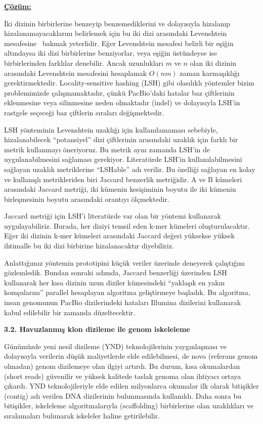\documentclass[11pt]{article}
\begin{document}
{\bf {\underline{Çözüm:}}}

İki dizinin birbirlerine benzeyip benzemediklerini ve dolayısıyla hizalanıp hizalanamayacaklarını belirlemek için bu iki dizi arasındaki Levenshtein mesafesine~\cite{Levenshtein1966} bakmak yeterlidir. Eğer Levenshtein mesafesi belirli bir eşiğin altındaysa iki dizi birbirlerine benziyorlar, veya eşiğin üstündeyse ise birbirlerinden farklılar denebilir. Ancak uzunlukları $m$ ve $n$ olan iki dizinin arasındaki Levenshtein mesafesini hesaplamak $O(nm)$ zaman karmaşıklığı gerektirmektedir. Locality-sensitive hashing (LSH) gibi olasılıklı yöntemler bizim problemimizde çalışmamaktadır,  çünkü PacBio'daki hatalar baz çiftlerinin eklenmesine veya silinmesine neden olmaktadır (indel) ve dolayısıyla LSH'in rastgele seçeceği baz çiftlerin sıraları değişmektedir.


LSH yönteminin Levenshtein uzaklığı için kullanılamaması sebebiyle, hizalanabilecek ``potansiyel'' dizi çiftlerinin arasındaki uzaklık için farklı bir metrik kullanmayı öneriyoruz. Bu metrik aynı zamanda LSH'in de uygulanabilmesini sağlaması gerekiyor. Literatürde LSH'in kullanılabilmesini sağlayan uzaklık metriklerine ``LSHable'' adı verilir. Bu özelliği sağlayan en kolay ve kullanışlı metrikleriden biri Jaccard benzerlik metriğidir. A ve B kümeleri arasındaki Jaccard metriği, iki kümenin kesişiminin boyutu ile iki kümenin birleşmesinin boyutu arasındaki orantıyı ölçmektedir.


Jaccard metriği için LSH'i literatürde var olan bir yöntemi \cite{Broder1998} kullanarak uygulayabiliriz. Burada, her diziyi temsil eden k-mer kümeleri oluşturulacaktır. Eğer iki dizinin k-mer kümeleri arasındaki Jaccard değeri yüksekse yüksek ihtimalle bu iki dizi birbirine hizalanacaktır diyebiliriz.

Anlattığımız yöntemin prototipini küçük veriler üzerinde deneyerek çalıştığını gözlemledik. Bundan sonraki adımda, Jaccard benzerliği üzerinden LSH kullanarak her kısa dizinin uzun diziler kümesindeki ``yaklaşık en yakın komşularını'' parallel hesaplayan algoritma geliştirmeye başladık. Bu algoritma, insan genomunun PacBio dizilerindeki hataları Illumina dizilerini kullanarak kabul edilebilir bir zamanda düzeltecektir.




{\bf \large 3.2. Havuzlanmış klon dizileme ile genom iskeleleme}


Günümüzde yeni nesil dizileme (YND) teknolojilerinin yaygınlaşması ve dolayısıyla verilerin düşük maliyetlerde elde edilebilmesi, de novo (referans genom olmadan) 
genom dizilemeye olan ilgiyi artırdı.
Bu durum, kısa okumalardan (short reads) güvenilir ve yüksek kalitede taslak genoma olan ihtiyacı ortaya çıkardı. YND teknolojileriyle elde edilen milyonlarca okumalar ilk olarak bitişikler (contig) adı verilen DNA dizilerinin bulunmasında kullanıldı. Daha sonra bu bitişikler, iskeleleme algoritmalarıyla (scaffolding) birbirlerine olan uzaklıkları ve sıralamaları bulunarak iskeleler haline getirilebilir.
\end{document}
